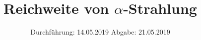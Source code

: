 

\subject{Nr.701}
\title{\texorpdfstring{Reichweite von $\alpha$-Strahlung}{Reichweite von Alpha-Strahlung}}
\date{%
  Durchführung: 14.05.2019
  \hspace{3em}
  Abgabe: 21.05.2019
}



\maketitle
\thispagestyle{empty}
\tableofcontents
\newpage






\printbibliography{}


